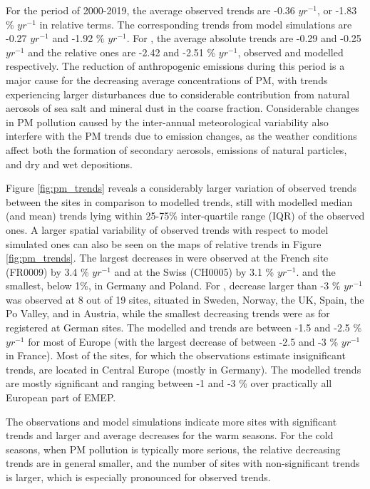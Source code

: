 For the period of 2000-2019, the average observed \PM[10] trends are -0.36 \ug $yr^{-1}$, or -1.83 \% $yr^{-1}$ in relative terms. The corresponding \PM[10] trends from model simulations are -0.27 \ug $yr^{-1}$ and -1.92 \% $yr^{-1}$. For \PM[2.5], the average absolute trends are -0.29 and -0.25 \ug $yr^{-1}$ and the relative ones are -2.42 and -2.51 \% $yr^{-1}$, observed and modelled respectively. The reduction of anthropogenic emissions during this period is a major cause for the decreasing average concentrations of PM, with \PM[10] trends experiencing larger disturbances due to considerable contribution from natural aerosols of sea salt and mineral dust in the coarse fraction. Considerable changes in PM pollution caused by the inter-annual meteorological variability also interfere with the PM trends due to emission changes, as the weather conditions affect both the formation of secondary aerosols, emissions of natural particles, and dry and wet depositions.


Figure \ref{fig:pm_trends} reveals a considerably larger variation of observed trends between the sites in comparison to modelled trends, still with modelled median (and mean) trends lying within 25-75\% inter-quartile range (IQR) of the observed ones. A larger spatial variability of observed trends with respect to model simulated ones can also be seen on the maps of relative trends in Figure \ref{fig:pm_trends}. The largest decreases in \PM[10] were observed at the French site (FR0009) by 3.4 \% $yr^{-1}$ and at the Swiss (CH0005) by 3.1 \% $yr^{-1}$. and the smallest, below 1\%, in Germany and Poland. For \PM[2.5], decrease larger than -3 \% $yr^{-1}$ was observed at 8 out of 19 sites, situated in Sweden, Norway, the UK, Spain, the Po Valley, and in Austria, while the smallest decreasing trends were as for \PM[10] registered at German sites. The modelled \PM[10] and \PM[2.5] trends are between -1.5 and -2.5 \% $yr^{-1}$ for most of Europe (with the largest decrease of \PM[2.5] between -2.5 and -3 \% $yr^{-1}$ in France). Most of the sites, for which the observations estimate insignificant trends, are located in Central Europe (mostly in Germany). The modelled trends are mostly significant and ranging between -1 and -3 \% over practically all European part of EMEP.

The observations and model simulations indicate more sites with significant trends and larger \PM[10] and \PM[2.5] average decreases for the warm seasons. For the cold seasons, when PM pollution is typically more serious, the relative decreasing trends are in general smaller, and the number of sites with non-significant trends is larger, which is especially pronounced for observed \PM[10] trends.

